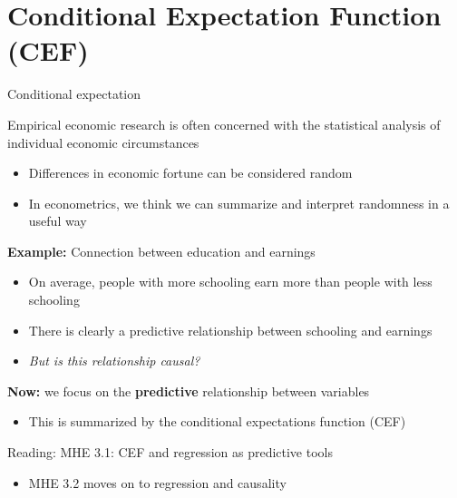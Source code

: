 \documentclass[compress, 8pt]{beamer}
\begin{document}




\section[CEF]{Conditional Expectation Function (CEF)}
\miniframesoff
\begin{frame}
    \tableofcontents[currentsection]
\end{frame}
\miniframeson



\begin{frame}{Conditional expectation}

Empirical economic research is often concerned with the statistical analysis of individual economic circumstances
\begin{itemize}
    \item Differences in economic fortune can be considered random
    \item In econometrics, we think we can summarize and interpret randomness in a useful way
\end{itemize}

\vspace{2ex}
\textbf{Example:} Connection between education and earnings
\begin{itemize}
    \item On average, people with more schooling earn more than people with less schooling
    \item There is clearly a predictive relationship between schooling and earnings
    \item \emph{But is this relationship causal?}
\end{itemize}

\vspace{2ex}
\textbf{Now:} we focus on the \textbf{predictive} relationship between variables
\begin{itemize}
    \item This is summarized by the conditional expectations function (CEF)
\end{itemize}
Reading: MHE 3.1: CEF and regression as predictive tools
\begin{itemize}
    \item MHE 3.2 moves on to regression and causality
\end{itemize}
\end{frame}
\end{document}
